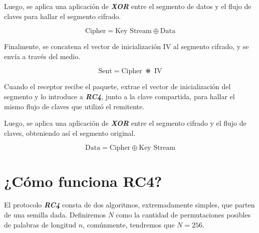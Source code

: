 \documentclass[
]{article}
\begin{document}
Luego, se aplica una aplicación de \textbf{\emph{XOR}} entre el segmento
de datos y el flujo de claves para hallar el segmento cifrado.

\[
\text{Cipher} = \text{Key Stream} \oplus \text{Data}
\]

Finalmente, se concatena el vector de inicialización \(\text{IV}\) al
segmento cifrado, y se envía a través del medio.

\[
\text{Sent} = \text{Cipher}\ ⧺\ \text{IV} 
\]

Cuando el receptor recibe el paquete, extrae el vector de inicialización
del segmento y lo introduce a \textbf{\emph{RC4}}, junto a la clave
compartida, para hallar el mismo flujo de claves que utilizó el
remitente.

Luego, se aplica una aplicación de \textbf{\emph{XOR}} entre el segmento
cifrado y el flujo de claves, obteniendo así el segmento original.

\[
\text{Data} = \text{Cipher} \oplus \text{Key Stream}
\]

\hypertarget{cuxf3mo-funciona-rc4}{%
\section{¿Cómo funciona RC4?}\label{cuxf3mo-funciona-rc4}}

El protocolo \textbf{\emph{RC4}} consta de dos algoritmos,
extremadamente simples, que parten de una semilla dada. Definiremos
\(N\) como la cantidad de permutaciones posibles de palabras de longitud
\(n\), comúnmente, tendremos que \(N = 256\).
\end{document}

